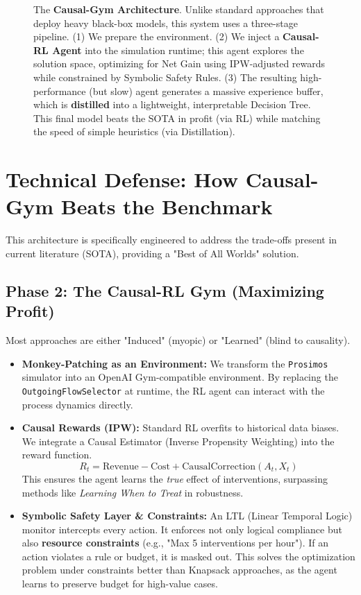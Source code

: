 \documentclass[a4paper]{article}
\begin{document}
\begin{figure}[H]
\begin{tikzpicture}
  \end{tikzpicture}
  \caption{The \textbf{Causal-Gym Architecture}. Unlike standard approaches that deploy heavy black-box models, this system uses a three-stage pipeline. (1) We prepare the environment. (2) We inject a \textbf{Causal-RL Agent} into the simulation runtime; this agent explores the solution space, optimizing for Net Gain using IPW-adjusted rewards while constrained by Symbolic Safety Rules. (3) The resulting high-performance (but slow) agent generates a massive experience buffer, which is \textbf{distilled} into a lightweight, interpretable Decision Tree. This final model beats the SOTA in profit (via RL) while matching the speed of simple heuristics (via Distillation).}
  \label{fig:causal-gym}
\end{figure}

\newpage

\section{Technical Defense: How Causal-Gym Beats the Benchmark}

This architecture is specifically engineered to address the trade-offs present in current literature (SOTA), providing a "Best of All Worlds" solution.

\subsection{Phase 2: The Causal-RL Gym (Maximizing Profit)}
Most approaches are either "Induced" (myopic) or "Learned" (blind to causality).
\begin{itemize}
    \item \textbf{Monkey-Patching as an Environment:} We transform the \texttt{Prosimos} simulator into an OpenAI Gym-compatible environment. By replacing the \texttt{OutgoingFlowSelector} at runtime, the RL agent can interact with the process dynamics directly.
    \item \textbf{Causal Rewards (IPW):} Standard RL overfits to historical data biases. We integrate a Causal Estimator (Inverse Propensity Weighting) into the reward function. 
    \[ R_t = \text{Revenue} - \text{Cost} + \text{CausalCorrection}(A_t, X_t) \]
    This ensures the agent learns the \textit{true} effect of interventions, surpassing methods like \textit{Learning When to Treat} in robustness.
    \item \textbf{Symbolic Safety Layer \& Constraints:} An LTL (Linear Temporal Logic) monitor intercepts every action. It enforces not only logical compliance but also \textbf{resource constraints} (e.g., "Max 5 interventions per hour"). If an action violates a rule or budget, it is masked out. This solves the optimization problem under constraints better than Knapsack approaches, as the agent learns to preserve budget for high-value cases.
\end{itemize}
\end{document}
